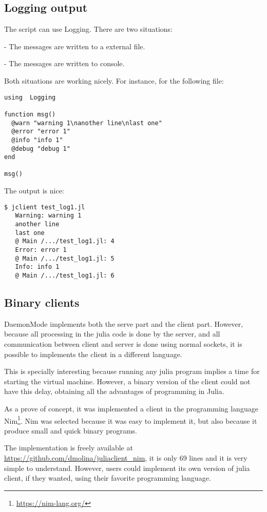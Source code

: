 \documentclass{juliacon}
\begin{document}
\subsection{Logging output}

The script can use Logging. There are two situations:

- The messages are written to a external file. 

- The messages are written to console. 

Both situations are working nicely. For instance, for the following  file:

\begin{lstlisting}
using  Logging

function msg()
  @warn "warning 1\nanother line\nlast one"
  @error "error 1"
  @info "info 1"
  @debug "debug 1"
end

msg()
\end{lstlisting}

The output is nice:
\begin{lstlisting}
$ jclient test_log1.jl
   Warning: warning 1
   another line
   last one
   @ Main /.../test_log1.jl: 4
   Error: error 1
   @ Main /.../test_log1.jl: 5
   Info: info 1
   @ Main /.../test_log1.jl: 6
\end{lstlisting}

\subsection{Binary clients}
\label{sec:jclient}

DaemonMode implements both the serve part and the client part. However, because
all processing in the julia code is done by the server, and all communication
between client and server is done using normal sockets, it is possible to
implements the client in a different language. 

This is specially interesting because running any julia program implies a time for
starting the virtual machine. However, a binary version of the client could not
have this delay, obtaining all the advantages of programming in Julia.

As a prove of concept, it was implemented a client in the programming language
Nim\footnote{\url{https://nim-lang.org/}}. Nim was selected because it was easy
to implement it, but also because it produce small and quick binary programs.

The implementation is freely available at
\url{https://github.com/dmolina/juliaclient_nim}, it is only 69 lines and it is
very simple to understand. However, users could implement its own version of
julia client, if they wanted, using their favorite programming language. 
\end{document}
